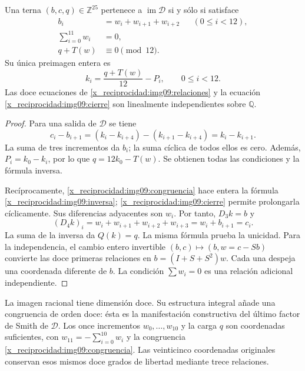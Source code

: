 \begin{theorem}
\label{x_reciprocidad:img09:imagen}
Una terna $(b,c,q)\in\mathbb Z^{25}$ pertenece a
$\operatorname{im}\mathcal D$ si y sólo si satisface
\begin{align}
 b_i&=w_i+w_{i+1}+w_{i+2}&& (0\leq i<12),
 \label{x_reciprocidad:img09:relaciones}\\
 \sum_{i=0}^{11}w_i&=0,
 \label{x_reciprocidad:img09:cierre}\\
 q+T(w)&\equiv0\pmod {12}.
 \label{x_reciprocidad:img09:congruencia}
\end{align}
Su única preimagen entera es
\begin{equation}
 k_i=\frac{q+T(w)}{12}-P_i,\qquad0\leq i<12.
 \label{x_reciprocidad:img09:inversa}
\end{equation}
Las doce ecuaciones de \eqref{x_reciprocidad:img09:relaciones} y la ecuación
\eqref{x_reciprocidad:img09:cierre} son linealmente independientes sobre $\mathbb Q$.
\end{theorem}
\begin{proof}
Para una salida de $\mathcal D$ se tiene
\[
 c_i-b_{i+1}=(k_i-k_{i+4})-(k_{i+1}-k_{i+4})=k_i-k_{i+1}.
\]
La suma de tres incrementos da $b_i$; la suma cíclica de todos ellos
es cero. Además, $P_i=k_0-k_i$, por lo que
$q=12k_0-T(w)$. Se obtienen todas las condiciones y la fórmula inversa.

Recíprocamente, \eqref{x_reciprocidad:img09:congruencia} hace entera la fórmula
\eqref{x_reciprocidad:img09:inversa}; \eqref{x_reciprocidad:img09:cierre} permite prolongarla
cíclicamente. Sus diferencias adyacentes son $w_i$. Por tanto,
$D_3k=b$ y
\[
 (D_4k)_i=w_i+w_{i+1}+w_{i+2}+w_{i+3}
 =w_i+b_{i+1}=c_i.
\]
La suma de la inversa da $Q(k)=q$. La misma fórmula prueba la unicidad.
Para la independencia, el cambio entero invertible
$(b,c)\mapsto(b,w=c-Sb)$ convierte las doce primeras relaciones en
$b=(I+S+S^2)w$. Cada una despeja una coordenada diferente de $b$.
La condición $\sum w_i=0$ es una relación adicional independiente.
\end{proof}

La imagen racional tiene dimensión doce. Su estructura integral añade
una congruencia de orden doce: ésta es la manifestación constructiva del
último factor de Smith de $\mathcal D$. Los once incrementos
$w_0,\ldots,w_{10}$ y la carga $q$ son coordenadas suficientes, con
$w_{11}=-\sum_{i=0}^{10}w_i$ y la congruencia
\eqref{x_reciprocidad:img09:congruencia}. Las veinticinco coordenadas originales
conservan esos mismos doce grados de libertad mediante trece relaciones.


